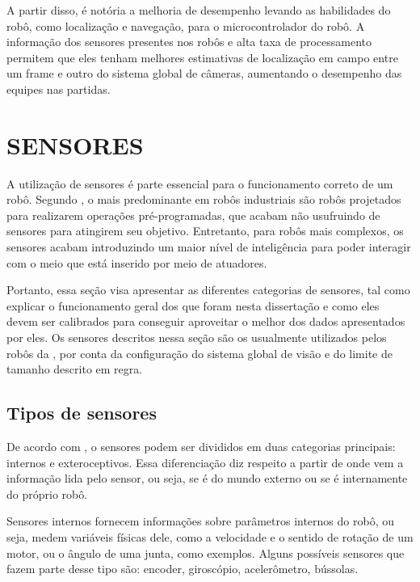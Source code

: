 \documentclass[acronym, symbols, table, deposito]{fei}
\begin{document}
				A partir disso, é notória a melhoria de desempenho levando as habilidades do robô, como localização e navegação, para o microcontrolador do robô. A informação dos sensores presentes nos robôs e alta taxa de processamento permitem que eles tenham melhores estimativas de localização em campo entre um frame e outro do sistema global de câmeras, aumentando o desempenho das equipes nas partidas.

	\section{SENSORES} \label{sec:sensores}
	
		A utilização de sensores é parte essencial para o funcionamento correto de um robô. Segundo \textcite{de2017tipos}, o mais predominante em robôs industriais são robôs projetados para realizarem operações pré-programadas, que acabam não usufruindo de sensores para atingirem seu objetivo. Entretanto, para robôs mais complexos, os sensores acabam introduzindo um maior nível de inteligência para poder interagir com o meio que está inserido por meio de atuadores.
		
		Portanto, essa seção visa apresentar as diferentes categorias de sensores, tal como explicar o funcionamento geral dos que foram nesta dissertação e como eles devem ser calibrados para conseguir aproveitar o melhor dos dados apresentados por eles. Os sensores descritos nessa seção são os usualmente utilizados pelos robôs da , por conta da configuração do sistema global de visão e do limite de tamanho descrito em regra.
		
		\subsection{Tipos de sensores}		
		
			De acordo com \textcite{sensorFusionKalmanFilter}, o sensores podem ser divididos em duas categorias principais: internos e exteroceptivos. Essa diferenciação diz respeito a partir de onde vem a informação lida pelo sensor, ou seja, se é do mundo externo ou se é internamente do próprio robô.
			
			Sensores internos fornecem informações sobre parâmetros internos do robô, ou seja, medem variáveis físicas dele, como a velocidade e o sentido de rotação de um motor, ou o ângulo de uma junta, como exemplos. Alguns possíveis sensores que fazem parte desse tipo são: encoder, giroscópio, acelerômetro, bússolas.
			
\end{document}

